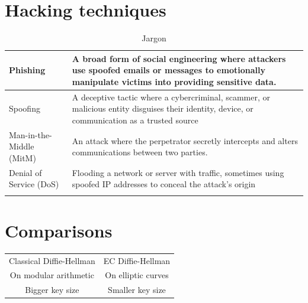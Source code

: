 \documentclass[a4paper, 12pt]{book} %
\begin{document}
\section{Hacking techniques}

\begin{longtable}{|lp{10cm}|} \hline 
    Phishing & A broad form of social engineering where attackers use spoofed emails or messages to emotionally manipulate victims into providing sensitive data. \\ \hline 
    Spoofing & A deceptive tactic where a cybercriminal, scammer, or malicious entity disguises their identity, device, or communication as a trusted source \\ \hline 
    Man-in-the-Middle (MitM) & An attack where the perpetrator secretly intercepts and alters communications between two parties. \\ \hline 
    Denial of Service (DoS) &  Flooding a network or server with traffic, sometimes using spoofed IP addresses to conceal the attack's origin \\ \hline 
    \caption{Jargon}
\end{longtable}


\section{Comparisons}

\begin{longtable}{||c|c||} \hline 
    Classical Diffie-Hellman & EC Diffie-Hellman \\
    On modular arithmetic & On elliptic curves \\ 
    Bigger key size & Smaller key size \\ \hline \hline 
\end{longtable}














\cite{adamson2012set}







\printindex
\end{document}
